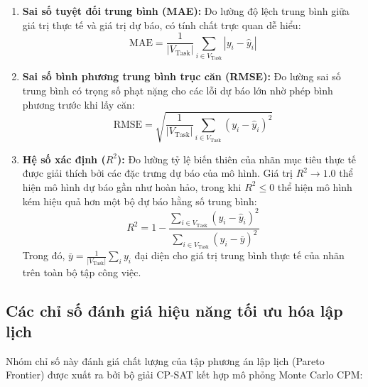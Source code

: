 \begin{enumerate}
    \item \textbf{Sai số tuyệt đối trung bình (MAE):} 
    Đo lường độ lệch trung bình giữa giá trị thực tế và giá trị dự báo, có tính chất trực quan dễ hiểu:
    $$\text{MAE} = \frac{1}{|V_{\text{Task}}|} \sum_{i \in V_{\text{Task}}} \left| y_i - \hat{y}_i \right|$$
    
    \item \textbf{Sai số bình phương trung bình trục căn (RMSE):}
    Đo lường sai số trung bình có trọng số phạt nặng cho các lỗi dự báo lớn nhờ phép bình phương trước khi lấy căn:
    $$\text{RMSE} = \sqrt{\frac{1}{|V_{\text{Task}}|} \sum_{i \in V_{\text{Task}}} \left( y_i - \hat{y}_i \right)^2}$$
    
    \item \textbf{Hệ số xác định ($R^2$):}
    Đo lường tỷ lệ biến thiên của nhãn mục tiêu thực tế được giải thích bởi các đặc trưng dự báo của mô hình. Giá trị $R^2 \rightarrow 1.0$ thể hiện mô hình dự báo gần như hoàn hảo, trong khi $R^2 \le 0$ thể hiện mô hình kém hiệu quả hơn một bộ dự báo hằng số trung bình:
    $$R^2 = 1 - \frac{\sum_{i \in V_{\text{Task}}} \left( y_i - \hat{y}_i \right)^2}{\sum_{i \in V_{\text{Task}}} \left( y_i - \bar{y} \right)^2}$$
    Trong đó, $\bar{y} = \frac{1}{|V_{\text{Task}}|} \sum_{i} y_i$ đại diện cho giá trị trung bình thực tế của nhãn trên toàn bộ tập công việc.
\end{enumerate}

\subsection{Các chỉ số đánh giá hiệu năng tối ưu hóa lập lịch}
Nhóm chỉ số này đánh giá chất lượng của tập phương án lập lịch (Pareto Frontier) được xuất ra bởi bộ giải CP-SAT kết hợp mô phỏng Monte Carlo CPM:

